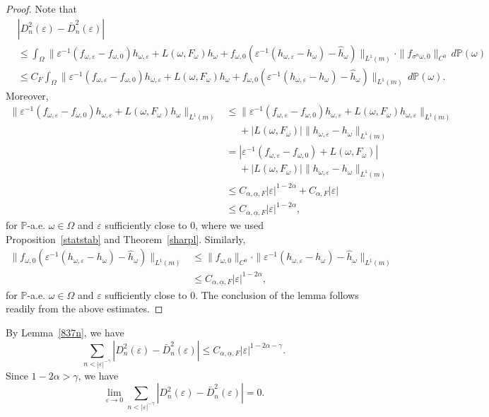 \documentclass[12pt,reqno,a4paper]{article}
\begin{document}
\begin{proof}
	Note that 
	\[
	\begin{split}
		&|D_n^2(\varepsilon)-\bar D_n^2(\varepsilon)|\\
		&\le \int_\Omega \|\varepsilon^{-1}(f_{\omega, \varepsilon}-f_{\omega, 0})h_{\omega, \varepsilon}+L(\omega, F_\omega)h_\omega+f_{\omega, 0}(\varepsilon^{-1}(h_{\omega, \varepsilon}-h_\omega)-\hat h_\omega)\|_{L^1(m)}\cdot \|f_{\sigma^n \omega, 0}\|_{C^0}\, d\mathbb P(\omega)\\
		&\le C_F\int_\Omega \|\varepsilon^{-1}(f_{\omega, \varepsilon}-f_{\omega, 0})h_{\omega, \varepsilon}+L(\omega, F_\omega)h_\omega+f_{\omega, 0}(\varepsilon^{-1}(h_{\omega, \varepsilon}-h_\omega)-\hat h_\omega)\|_{L^1(m)}\, d\mathbb P(\omega).
	\end{split}
	\]
	Moreover, 
	\[
	\begin{split}
		\|\varepsilon^{-1}(f_{\omega, \varepsilon}-f_{\omega, 0})h_{\omega, \varepsilon}+L(\omega, F_\omega)h_\omega\|_{L^1(m)}  &\le \|\varepsilon^{-1}(f_{\omega, \varepsilon}-f_{\omega, 0})h_{\omega, \varepsilon}+L(\omega, F_\omega)h_{\omega, \varepsilon}\|_{L^1(m)} \\
		&\phantom{\le}+|L(\omega, F_\omega)|\|h_{\omega, \varepsilon}-h_\omega\|_{L^1(m)}\\
		&= \left |\varepsilon^{-1}(f_{\omega, \varepsilon}-f_{\omega, 0})+L(\omega, F_\omega)\right |\\
		&\phantom{=}+|L(\omega, F_\omega)|\|h_{\omega, \varepsilon}-h_\omega\|_{L^1(m)}\\
		&\le C_{\alpha, \underline{\alpha}, F}|\varepsilon|^{1- 2\alpha}+C_{\alpha, F} |\varepsilon| \\
		&\le C_{\alpha, \underline{\alpha}, F}|\varepsilon|^{1-2\alpha},
	\end{split}
	\]
	for $\mathbb P$-a.e. $\omega \in \Omega$ and $\varepsilon$ sufficiently close to $0$, where we used Proposition~\ref{statstab} and Theorem~\ref{sharpl}.
	Similarly,\[
	\begin{split}
		\|f_{\omega, 0}(\varepsilon^{-1}(h_{\omega, \varepsilon}-h_\omega)-\hat h_\omega)\|_{L^1(m)}&\le \|f_{\omega, 0}\|_{C^0} \cdot \|\varepsilon^{-1}(h_{\omega, \varepsilon}-h_\omega)-\hat h_\omega\|_{L^1(m)}\\
		&\le C_{\alpha, \underline{\alpha}, F}|\varepsilon|^{1-2\alpha},
	\end{split}
	\]
	for $\mathbb P$-a.e. $\omega \in \Omega$ and $\varepsilon$ sufficiently close to $0$. The conclusion of the lemma follows readily from the above estimates.
\end{proof}
By Lemma~\ref{837n}, we have \[
\sum_{n<|\varepsilon|^{-\gamma}}| D_n^2(\varepsilon)-\bar D_n^2(\varepsilon)| \le C_{\alpha, \underline{\alpha}, F}|\varepsilon|^{1-2\alpha-\gamma}. 
\]
Since $
1-2\alpha>\gamma$,
we have 
\begin{equation}\label{w11}
	\lim_{\varepsilon \to 0}\sum_{n<|\varepsilon|^{-\gamma}}| D_n^2(\varepsilon)-\bar D_n^2(\varepsilon)|=0.
\end{equation}
\end{document}
